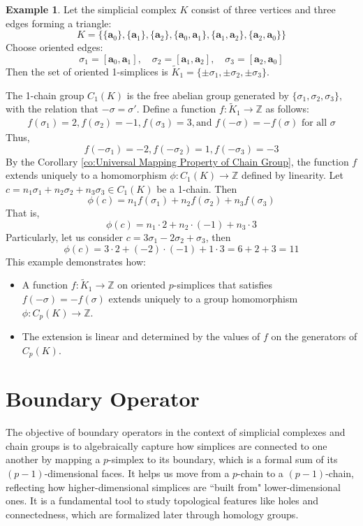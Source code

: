 \documentclass[12pt,oneside,reqno]{amsart}
\theoremstyle{plain}
\theoremstyle{definition}
\newtheorem{example}{Example}[section]
\theoremstyle{remark}
\newcommand{\0}{{\textbf{0}}}
\begin{document}
\begin{example}\label{eq:Universal Mapping Property of Chain Group}
Let the simplicial complex $K$ consist of three vertices and three edges forming a triangle:
\[K = \{\{\mathbf{a}_0\}, \{\mathbf{a}_1\}, \{\mathbf{a}_2\}, \{\mathbf{a}_0, \mathbf{a}_1\}, \{\mathbf{a}_1, \mathbf{a}_2\}, \{\mathbf{a}_2, \mathbf{a}_0\}\}\]
Choose oriented edges:
\[
\sigma_1 = [\mathbf{a}_0, \mathbf{a}_1], \quad \sigma_2 = [\mathbf{a}_1, \mathbf{a}_2], \quad \sigma_3 = [\mathbf{a}_2, \mathbf{a}_0]
\]
Then the set of oriented 1-simplices is $\widetilde{K}_1 = \{ \pm \sigma_1, \pm \sigma_2, \pm \sigma_3 \}$.

The 1-chain group $C_1(K)$ is the free abelian group generated by $\{ \sigma_1, \sigma_2, \sigma_3 \}$, with the relation that $-\sigma = \sigma'$. Define a function $f \colon \widetilde{K}_1 \to \mathbb{Z}$ as follows:
\begin{gather*}
f(\sigma_1) = 2, f(\sigma_2) = -1,
f(\sigma_3) = 3, 
\text{and } f(-\sigma) = -f(\sigma) \text{ for all } \sigma
\end{gather*}
Thus,
\[
f(-\sigma_1) = -2, f(-\sigma_2) = 1,
f(-\sigma_3) = -3
\]
By the Corollary  \eqref{co:Universal Mapping Property of Chain Group}, the function $f$ extends uniquely to a homomorphism $\phi: C_1(K) \to \mathbb{Z}$ defined by linearity. Let $c = n_1 \sigma_1 + n_2 \sigma_2 + n_3 \sigma_3 \in C_1(K)$ be a 1-chain. Then
\[
\phi(c) = n_1 f(\sigma_1) + n_2 f(\sigma_2) + n_3 f(\sigma_3)
\]
That is,
\[
\phi(c) = n_1 \cdot 2 + n_2 \cdot (-1) + n_3 \cdot 3
\]
Particularly, let us consider  $c = 3\sigma_1 - 2\sigma_2 + \sigma_3$, then
\[
\phi(c) = 3 \cdot 2 + (-2) \cdot (-1) + 1 \cdot 3 = 6 + 2 + 3 = 11
\]
This example demonstrates how:
\begin{itemize}
    \item A function $f \colon \widetilde{K}_1 \to \mathbb{Z}$ on oriented $p$-simplices that satisfies $f(-\sigma) = -f(\sigma)$ extends uniquely to a group homomorphism $\phi \colon C_p(K) \to \mathbb{Z}$.
    \item The extension is linear and determined by the values of $f$ on the generators of $C_p(K)$.
\end{itemize}
\end{example}
\section{Boundary Operator}\label{s:Boundary Operator}
The objective of boundary operators in the context of simplicial complexes and chain groups is to algebraically capture how simplices are connected to one another by mapping a $p$-simplex to its boundary, which is a formal sum of its $(p-1)$-dimensional faces. It helps us move from a $p$-chain to a $(p-1)$-chain, reflecting how higher-dimensional simplices are ``built from" lower-dimensional ones. It is a fundamental tool to study topological features like holes and connectedness, which are formalized later through homology groups. 
\end{document}
